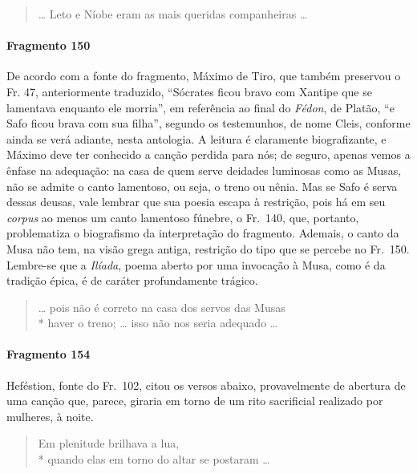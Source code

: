 \begin{verse}
\ldots{} Leto e Níobe eram as mais queridas companheiras \ldots{}
\end{verse}

\paragraph{Fragmento 150}

{\small De acordo com a fonte do fragmento, Máximo de Tiro, que também preservou o Fr.
47, anteriormente traduzido, ``Sócrates ficou bravo com Xantipe que se
lamentava enquanto ele morria”, em referência ao final do \textit{Fédon}, de
Platão, ``e Safo ficou brava com sua filha”, segundo os testemunhos, de
nome Cleis, conforme ainda se verá adiante, nesta antologia. A leitura é
claramente biografizante, e Máximo deve ter conhecido a canção perdida para
nós; de seguro, apenas vemos a ênfase na adequação: na casa de quem serve
deidades luminosas como as Musas, não se admite o canto lamentoso, ou seja, o
treno ou nênia. Mas se Safo é serva dessas deusas, vale lembrar que sua poesia
escapa à restrição, pois há em seu \textit{corpus} ao menos um canto lamentoso
fúnebre, o Fr.~140, que, portanto, problematiza o biografismo da interpretação
do fragmento. Ademais, o canto da Musa não tem, na visão grega antiga,
restrição do tipo que se percebe no Fr.~150. Lembre-se que a \textit{Ilíada},
poema aberto por uma invocação à Musa, como é da tradição épica, é de caráter
profundamente trágico.}

\begin{verse}
\ldots{} pois não é correto na casa dos servos das Musas\\*
haver o treno; \ldots{} isso não nos seria adequado \ldots{}
\end{verse}

\paragraph{Fragmento 154}

{\small Heféstion, fonte do Fr.~102, citou os versos abaixo, provavelmente de abertura
de uma canção que, parece, giraria em torno de um rito sacrificial realizado
por mulheres, à noite.}

\begin{verse}
Em plenitude brilhava a lua, \\*
quando elas em torno do altar se postaram \ldots{}
\end{verse}

